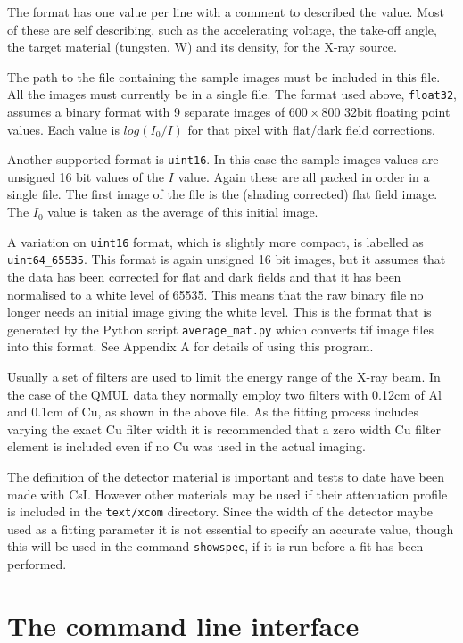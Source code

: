 \documentclass[a4paper,12pt]{article}
\begin{document}
The format has one value per line with a comment to described the value.
Most of these are self describing, such as the accelerating voltage, the take-off angle,
the target material (tungsten, W) and its density, for the X-ray source.

The path to the file containing the sample images must be included in this file.
All the images must currently be in a single file.
The format used above, \texttt{float32}, assumes a binary format with 9 separate images of $600 \times 800$ 32bit floating
point values.
Each value is $log ( I_0 / I )$ for that pixel with flat/dark field corrections.

Another supported format is \texttt{uint16}. In this case the sample images values are unsigned 16 bit values of the $I$ value.
Again these are all packed in order in a single file. The first image of the file is the (shading corrected) flat field image.
The $I_0$ value is taken as the average of this initial image.

A variation on \texttt{uint16} format, which is slightly more compact, is labelled as \texttt{uint64\_65535}.
This format is again unsigned 16 bit images, but it assumes that the data has been corrected for flat and dark fields
and that it has been normalised to a white level of 65535.
This means that the raw binary file no longer needs an initial image giving the white level.
This is the format that is generated by the Python script \texttt{average\_mat.py} which converts tif image files into this format.
See Appendix A for details of using this program.
 
Usually a set of filters are used to limit the energy range of the X-ray beam. In the case of the QMUL data they
normally employ two filters with 0.12cm of Al and 0.1cm of Cu, as shown in the above file.
As the fitting process includes varying the exact Cu filter width it is recommended that a zero width Cu filter element is included
even if no Cu was used in the actual imaging.

The definition of the detector material is important and tests to date have been made with CsI. However other materials may be used
if their attenuation profile is included in the \texttt{text/xcom} directory.
Since the width of the detector maybe used as a fitting parameter it is not essential to specify an accurate value, though this
will be used in the command \texttt{showspec}, if it is run before a fit has been performed.

\section{The command line interface}
\end{document}
